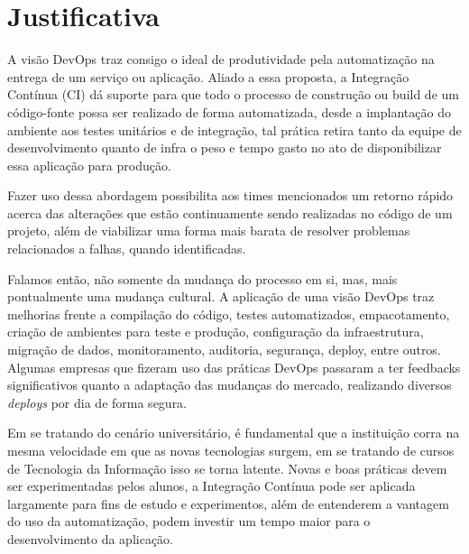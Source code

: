 \chapter{Justificativa}\label{cap: justificativa}

A visão DevOps traz consigo o ideal de produtividade pela automatização na entrega de um serviço ou aplicação. Aliado a essa proposta, a Integração Contínua (CI) dá suporte para que todo o processo de construção ou build de um código-fonte possa ser realizado de forma automatizada, desde a implantação do ambiente aos testes unitários e de integração, tal prática retira tanto da equipe de desenvolvimento quanto de infra o peso e tempo gasto no ato de disponibilizar essa aplicação para produção.

Fazer uso dessa abordagem possibilita aos times mencionados um retorno rápido acerca das alterações que estão continuamente sendo realizadas no código de um projeto, além de viabilizar uma forma mais barata de resolver problemas relacionados a falhas, quando identificadas.

Falamos então, não somente da mudança do processo em si, mas, mais pontualmente uma mudança cultural. A aplicação de uma visão DevOps traz melhorias frente a compilação do código, testes automatizados, empacotamento, criação de ambientes para teste e produção, configuração da infraestrutura, migração de dados, monitoramento, auditoria, segurança, deploy, entre outros. Algumas empresas que fizeram uso das práticas DevOps passaram a ter feedbacks significativos quanto a adaptação das mudanças do mercado, realizando diversos \textit{deploys} por dia de forma segura.\cite{sato2014devops}

Em se tratando do cenário universitário, é fundamental que a instituição corra na mesma velocidade em que as novas tecnologias surgem, em se tratando de cursos de Tecnologia da Informação isso se torna latente. Novas e boas práticas devem ser experimentadas pelos alunos, a Integração Contínua pode ser aplicada largamente para fins de estudo e experimentos, além de entenderem a vantagem do uso da automatização, podem investir um tempo maior para o desenvolvimento da aplicação.